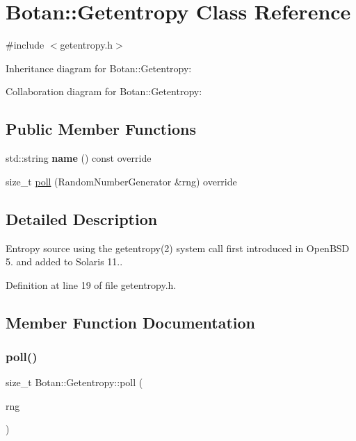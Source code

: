 \hypertarget{class_botan_1_1_getentropy}{}\section{Botan\+:\+:Getentropy Class Reference}
\label{class_botan_1_1_getentropy}


{\ttfamily \#include $<$getentropy.\+h$>$}



Inheritance diagram for Botan\+:\+:Getentropy\+:


Collaboration diagram for Botan\+:\+:Getentropy\+:
\subsection*{Public Member Functions}
\begin{DoxyCompactItemize}
\item 
\mbox{\label{class_botan_1_1_getentropy_a7b69089b1126999eaec7e9730c2f9d77}} 
std\+::string {\bfseries name} () const override
\item 
size\+\_\+t \mbox{\hyperlink{class_botan_1_1_getentropy_a71a5f10a7fc73f76adc80204eac86365}{poll}} (Random\+Number\+Generator \&rng) override
\end{DoxyCompactItemize}


\subsection{Detailed Description}
Entropy source using the getentropy(2) system call first introduced in Open\+B\+SD 5. and added to Solaris 11.. 

Definition at line 19 of file getentropy.\+h.



\subsection{Member Function Documentation}
\mbox{\label{class_botan_1_1_getentropy_a71a5f10a7fc73f76adc80204eac86365}} 
\subsubsection{\texorpdfstring{poll()}{poll()}}
{\footnotesize\ttfamily size\+\_\+t Botan\+::\+Getentropy\+::poll (\begin{DoxyParamCaption}\item[{Random\+Number\+Generator \&}]{rng }\end{DoxyParamCaption})\hspace{0.3cm}{\ttfamily [override]}}

